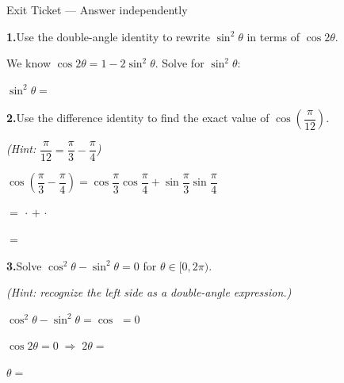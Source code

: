 \documentclass[10pt]{article}
\begin{document}
\namedateperiod

\vspace{0.12in}

\begin{notesbox}{Exit Ticket --- Answer independently}

\textbf{1.}\quad Use the double-angle identity to rewrite $\sin^2\theta$
in terms of $\cos 2\theta$.

\vspace{4pt}
We know $\cos 2\theta = 1 - 2\sin^2\theta$. Solve for $\sin^2\theta$:

\vspace{6pt}
$\sin^2\theta = $ \underline{\hspace{5cm}}

\vspace{0.16in}
\textbf{2.}\quad Use the difference identity to find the exact value of
$\cos\!\left(\dfrac{\pi}{12}\right)$.

\vspace{4pt}
\textit{(Hint:} $\dfrac{\pi}{12} = \dfrac{\pi}{3} - \dfrac{\pi}{4}$\textit{)}

\vspace{4pt}
$\cos\!\left(\dfrac{\pi}{3} - \dfrac{\pi}{4}\right)
= \cos\dfrac{\pi}{3}\cos\dfrac{\pi}{4} + \sin\dfrac{\pi}{3}\sin\dfrac{\pi}{4}$

\vspace{6pt}
$= $ \underline{\hspace{1.4cm}} $\cdot$ \underline{\hspace{1.4cm}}
$+$ \underline{\hspace{1.4cm}} $\cdot$ \underline{\hspace{1.4cm}}

\vspace{6pt}
$= $ \underline{\hspace{4.5cm}}

\vspace{0.16in}
\textbf{3.}\quad Solve $\cos^2\theta - \sin^2\theta = 0$ for $\theta \in [0, 2\pi)$.

\vspace{4pt}
\textit{(Hint: recognize the left side as a double-angle expression.)}

\vspace{4pt}
$\cos^2\theta - \sin^2\theta = \cos$ \underline{\hspace{1.2cm}} $= 0$

\vspace{6pt}
$\cos 2\theta = 0 \;\Rightarrow\; 2\theta = $ \underline{\hspace{3cm}}

\vspace{6pt}
$\theta = $ \underline{\hspace{5cm}}

\end{notesbox}
\end{document}
